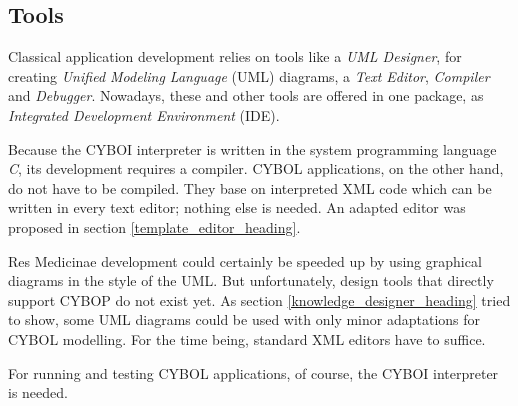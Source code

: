 %
%
%
%
%
%
%

\subsection{Tools}
\label{tools_heading}

Classical application development relies on tools like a \emph{UML Designer}, for
creating \emph{Unified Modeling Language} (UML) diagrams, a \emph{Text Editor},
\emph{Compiler} and \emph{Debugger}. Nowadays, these and other tools are
offered in one package, as \emph{Integrated Development Environment} (IDE).

Because the CYBOI interpreter is written in the system programming language
\emph{C}, its development requires a compiler. CYBOL applications, on the other
hand, do not have to be compiled. They base on interpreted XML code which can
be written in every text editor; nothing else is needed. An adapted editor was
proposed in section \ref{template_editor_heading}.

Res Medicinae development could certainly be speeded up by using graphical
diagrams in the style of the UML. But unfortunately, design tools that directly
support CYBOP do not exist yet. As section \ref{knowledge_designer_heading}
tried to show, some UML diagrams could be used with only minor adaptations for
CYBOL modelling. For the time being, standard XML editors have to suffice.

For running and testing CYBOL applications, of course, the CYBOI interpreter is
needed.
